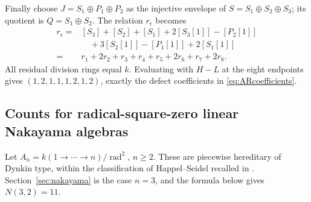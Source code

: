 \documentclass[pdflatex,sn-mathphys-num]{sn-jnl}
\numberwithin{equation}{section}
\theoremstyle{definition}
\theoremstyle{remark}\newtheorem{remark}[theorem]{Remark}
\newcommand{\rad}{\operatorname{rad}}
\begin{document}
Finally choose $J=S_1\oplus P_1\oplus P_2$ as the injective envelope
of $S=S_1\oplus S_2\oplus S_3$; its quotient is $Q=S_1\oplus S_2$.
The relation $r_\epsilon$ becomes
\begin{align*}
 r_\epsilon={}&[S_3]+[S_2]+[S_1]+2[S_3[1]]-[P_2[1]]\\
             &\quad+3[S_2[1]]-[P_1[1]]+2[S_1[1]]\\
 ={}&r_1+2r_2+r_3+r_4+r_5+2r_6+r_7+2r_8.
\end{align*}
All residual division rings equal $k$. Evaluating with $H-L$ at the
eight endpoints gives $(1,2,1,1,1,2,1,2)$, exactly the defect coefficients
in \eqref{eq:ARcoefficients}.

\subsection{Counts for radical-square-zero linear Nakayama algebras}\label{sec:counts}
Let $A_n=k(1\to\cdots\to n)/\rad^2$, $n\geq2$.
These are piecewise hereditary of Dynkin type, within the classification
of Happel--Seidel \cite{HS} recalled in \cite[Section 4.1]{Rundsveen}.
Section~\ref{sec:nakayama} is the
case $n=3$, and the formula below gives $N(3,2)=11$.
\end{document}
